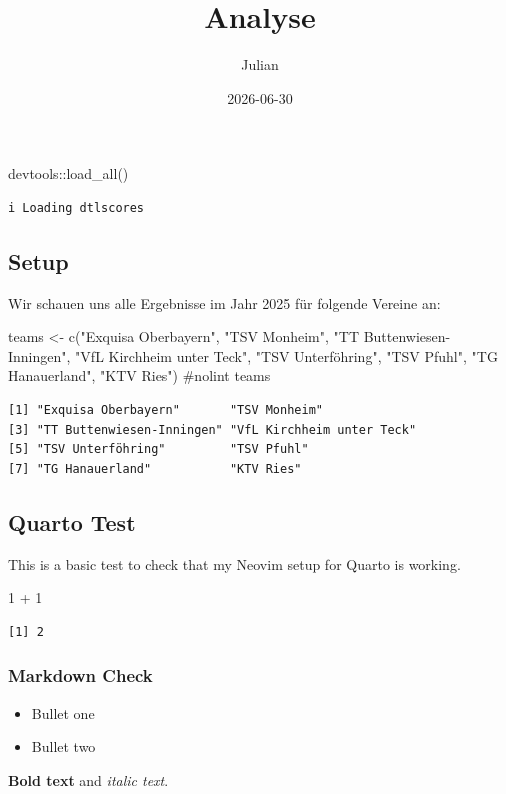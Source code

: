 \documentclass[
  letterpaper,
  DIV=11,
  numbers=noendperiod]{scrartcl}
\title{Analyse}
\author{Julian}
\date{2026-06-30}
\newenvironment{Shaded}{\begin{snugshade}}{\end{snugshade}}
\newcommand{\CommentTok}[1]{\textcolor[rgb]{0.37,0.37,0.37}{#1}}
\newcommand{\DecValTok}[1]{\textcolor[rgb]{0.68,0.00,0.00}{#1}}
\newcommand{\FunctionTok}[1]{\textcolor[rgb]{0.28,0.35,0.67}{#1}}
\newcommand{\NormalTok}[1]{\textcolor[rgb]{0.00,0.23,0.31}{#1}}
\newcommand{\OtherTok}[1]{\textcolor[rgb]{0.00,0.23,0.31}{#1}}
\newcommand{\SpecialCharTok}[1]{\textcolor[rgb]{0.37,0.37,0.37}{#1}}
\newcommand{\StringTok}[1]{\textcolor[rgb]{0.13,0.47,0.30}{#1}}
\providecommand{\tightlist}{%
  \setlength{\itemsep}{0pt}\setlength{\parskip}{0pt}}
\begin{document}
\maketitle


\begin{Shaded}
\begin{Highlighting}[]
\NormalTok{devtools}\SpecialCharTok{::}\FunctionTok{load\_all}\NormalTok{()}
\end{Highlighting}
\end{Shaded}

\begin{verbatim}
i Loading dtlscores
\end{verbatim}

\subsection{Setup}\label{setup}

Wir schauen uns alle Ergebnisse im Jahr 2025 für folgende Vereine an:

\begin{Shaded}
\begin{Highlighting}[]
\NormalTok{teams }\OtherTok{\textless{}{-}} \FunctionTok{c}\NormalTok{(}\StringTok{"Exquisa Oberbayern"}\NormalTok{, }\StringTok{"TSV Monheim"}\NormalTok{, }\StringTok{"TT Buttenwiesen{-}Inningen"}\NormalTok{, }\StringTok{"VfL Kirchheim unter Teck"}\NormalTok{, }\StringTok{"TSV Unterföhring"}\NormalTok{, }\StringTok{"TSV Pfuhl"}\NormalTok{, }\StringTok{"TG Hanauerland"}\NormalTok{, }\StringTok{"KTV Ries"}\NormalTok{) }\CommentTok{\#nolint}
\NormalTok{teams}
\end{Highlighting}
\end{Shaded}

\begin{verbatim}
[1] "Exquisa Oberbayern"       "TSV Monheim"             
[3] "TT Buttenwiesen-Inningen" "VfL Kirchheim unter Teck"
[5] "TSV Unterföhring"         "TSV Pfuhl"               
[7] "TG Hanauerland"           "KTV Ries"                
\end{verbatim}

\subsection{Quarto Test}\label{quarto-test}

This is a basic test to check that my Neovim setup for Quarto is
working.

\begin{Shaded}
\begin{Highlighting}[]
\DecValTok{1} \SpecialCharTok{+} \DecValTok{1}
\end{Highlighting}
\end{Shaded}

\begin{verbatim}
[1] 2
\end{verbatim}

\subsubsection{Markdown Check}\label{markdown-check}

\begin{itemize}
\tightlist
\item
  Bullet one
\item
  Bullet two
\end{itemize}

\textbf{Bold text} and \emph{italic text}.
\end{document}
